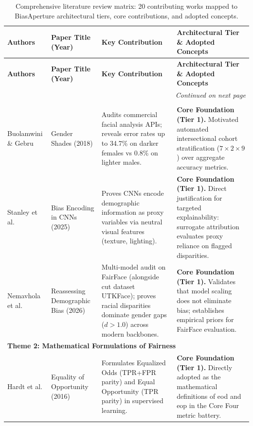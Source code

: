 \begin{center}
\setlength{\tabcolsep}{3pt}
\begin{longtable}{|p{2.2cm}|p{2.6cm}|p{4.4cm}|p{4.4cm}|}
\caption{Comprehensive literature review matrix: 20 contributing works mapped to BiasAperture architectural tiers, core contributions, and adopted concepts.}
\label{tab:litreview} \\
\hline
\textbf{Authors} & \textbf{Paper Title (Year)} & \textbf{Key Contribution} & \textbf{Architectural Tier \& Adopted Concepts} \\
\hline
\endfirsthead

\hline
\textbf{Authors} & \textbf{Paper Title (Year)} & \textbf{Key Contribution} & \textbf{Architectural Tier \& Adopted Concepts} \\
\hline
\endhead

\hline \multicolumn{4}{r}{\textit{Continued on next page}} \\
\endfoot

\hline
\endlastfoot

\multicolumn{4}{|l|}{\textbf{Theme 1: Empirical Foundations of Intersectional Bias}} \\
\hline
Buolamwini \& Gebru \cite{buolamwini2018gendershades} &
Gender Shades (2018) &
Audits commercial facial analysis APIs; reveals error rates up to 34.7\% on darker females vs 0.8\% on lighter males. &
\textbf{Core Foundation (Tier 1).} Motivated automated intersectional cohort stratification ($7 \times 2 \times 9$) over aggregate accuracy metrics. \\
\hline

Stanley et al. \cite{stanley2025bias} &
Bias Encoding in CNNs (2025) &
Proves CNNs encode demographic information as proxy variables via neutral visual features (texture, lighting). &
\textbf{Core Foundation (Tier 1).} Direct justification for targeted explainability: surrogate attribution evaluates proxy reliance on flagged disparities. \\
\hline

Nemavhola et al. \cite{nemavhola2026reassessing} &
Reassessing Demographic Bias (2026) &
Multi-model audit on FairFace (alongside cut dataset UTKFace); proves racial disparities dominate gender gaps ($d > 1.0$) across modern backbones. &
\textbf{Core Foundation (Tier 1).} Validates that model scaling does not eliminate bias; establishes empirical priors for FairFace evaluation. \\
\hline

\multicolumn{4}{|l|}{\textbf{Theme 2: Mathematical Formulations of Fairness}} \\
\hline
Hardt et al. \cite{hardt2016equality} &
Equality of Opportunity (2016) &
Formulates Equalized Odds (TPR+FPR parity) and Equal Opportunity (TPR parity) in supervised learning. &
\textbf{Core Foundation (Tier 1).} Directly adopted as the mathematical definitions of \gls{eod} and \gls{eop} in the Core Four metric battery. \\
\hline


\end{longtable}
\end{center}
